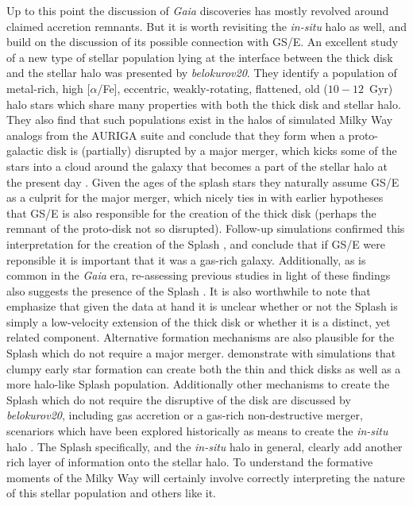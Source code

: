 Up to this point the discussion of \textit{Gaia} discoveries has mostly revolved around claimed accretion remnants. But it is worth revisiting the \textit{in-situ} halo as well, and build on the discussion of its possible connection with GS/E. An excellent study of a new type of stellar population lying at the interface between the thick disk and the stellar halo was presented by \textit{belokurov20}. They identify a population of metal-rich, high [$\alpha$/Fe], eccentric, weakly-rotating, flattened, old ($10-12$~Gyr) halo stars which share many properties with both the thick disk and stellar halo. They also find that such populations exist in the halos of simulated Milky Way analogs from the AURIGA suite and conclude that they form when a proto-galactic disk is (partially) disrupted by a major merger, which kicks some of the stars into a cloud around the galaxy that becomes a part of the stellar halo at the present day \parencite{mccarthy12}. Given the ages of the splash stars they naturally assume GS/E as a culprit for the major merger, which nicely ties in with earlier hypotheses that GS/E is also responsible for the creation of the thick disk (perhaps the remnant of the proto-disk not so disrupted). Follow-up simulations confirmed this interpretation for the creation of the Splash \parencite{grand20,renaud21}, and conclude that if GS/E were reponsible it is important that it was a gas-rich galaxy. Additionally, as is common in the \textit{Gaia} era, re-assessing previous studies in light of these findings also suggests the presence of the Splash \parencite[e.g.][]{bonaca17,dimatteo19,gallart19,amarante20a}. It is also worthwhile to note that \textcite{belokurov20} emphasize that given the data at hand it is unclear whether or not the Splash is simply a low-velocity extension of the thick disk or whether it is a distinct, yet related component. Alternative formation mechanisms are also plausible for the Splash which do not require a major merger. \textcite{amarante20b} demonstrate with simulations that clumpy early star formation can create both the thin and thick disks as well as a more halo-like Splash population. Additionally other mechanisms to create the Splash which do not require the disruptive of the disk are discussed by \textit{belokurov20}, including gas accretion or a gas-rich non-destructive merger, scenariors which have been explored historically as means to create the \textit{in-situ} halo \parencite[see][]{cooper15}. The Splash specifically, and the \textit{in-situ} halo in general, clearly add another rich layer of information onto the stellar halo. To understand the formative moments of the Milky Way will certainly involve correctly interpreting the nature of this stellar population and others like it.

